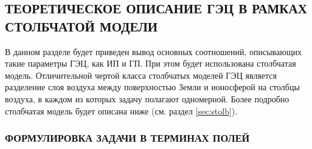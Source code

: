 \subsection{ТЕОРЕТИЧЕСКОЕ ОПИСАНИЕ ГЭЦ В РАМКАХ СТОЛБЧАТОЙ МОДЕЛИ}

В данном разделе будет приведен вывод основных соотношений, описывающих такие параметры ГЭЦ, как ИП и ГП. При этом будет использована столбчатая модель. Отличительной чертой класса столбчатых моделей ГЭЦ является разделение слоя воздуха между поверхностью Земли и ионосферой на столбцы воздуха, в каждом из которых задачу полагают одномерной. Более подробно столбчатая модель будет описана ниже (см. раздел \ref{sec:stolb}).

\subsubsection{ФОРМУЛИРОВКА ЗАДАЧИ В ТЕРМИНАХ ПОЛЕЙ}

